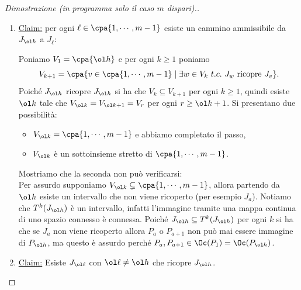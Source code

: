 \begin{proof}[Dimostrazione (in programma solo il caso $m$ dispari).]
\begin{enumerate}
\item \underline{Claim:} per ogni $\ell\in \cpa{1,\cdots, m-1}$ esiste un cammino ammissibile da $J_{\ol h}$ a $J_{\ell}$:

Poniamo $V_1=\cpa{\ol h}$ e per ogni $k\geq1$ poniamo 
\[V_{k+1}=\cpa{v\in \cpa{1,\cdots, m-1}\mid \exists w\in V_k\ t.c.\ J_w\text{ ricopre }J_v}.\]
Poich\'e $J_{\ol h}$ ricopre $J_{\ol h}$ si ha che $V_k\subseteq V_{k+1}$ per ogni $k\geq 1$, quindi esiste $\ol k$ tale che $V_{\ol k}=V_{\ol k+1}=V_r$ per ogni $r\geq \ol k+1$. Si presentano due possibilit\`a:
\begin{itemize}
\item $V_{\ol k}=\cpa{1,\cdots,m-1}$ e abbiamo completato il passo,
\item $V_{\ol k}$ \`e un sottoinsieme stretto di $\cpa{1,\cdots, m-1}$.
\end{itemize} 
Mostriamo che la seconda non pu\`o verificarsi:\\
Per assurdo supponiamo $V_{\ol k}\subsetneq \cpa{1,\cdots, m-1}$, allora partendo da $\ol h$ esiste un intervallo che non viene ricoperto (per esempio $J_a$). Notiamo che $T^k(J_{\ol h})$ \`e un intervallo, infatti l'immagine tramite una mappa continua di uno spazio connesso \`e connessa. Poich\'e $J_{\ol h}\subseteq T^k(J_{\ol h})$ per ogni $k$ si ha che se $J_{a}$ non viene ricoperto allora $P_a$ o $P_{a+1}$ non pu\`o mai essere immagine di $P_{\ol h}$, ma questo \`e assurdo perch\'e $P_a,P_{a+1}\in \Oc(P_1)=\Oc(P_{\ol h})$.
\item \underline{Claim:} Esiste $J_{\ol \ell}$ con $\ol \ell\neq \ol h$ che ricopre $J_{\ol h}$.


\end{enumerate}
\end{proof}
